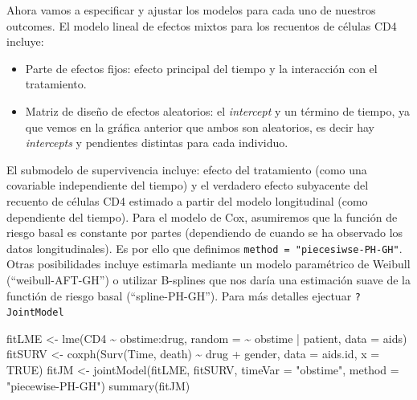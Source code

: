 \documentclass[
]{book}
\newenvironment{Shaded}{\begin{snugshade}}{\end{snugshade}}
\newcommand{\AttributeTok}[1]{\textcolor[rgb]{0.77,0.63,0.00}{#1}}
\newcommand{\ConstantTok}[1]{\textcolor[rgb]{0.00,0.00,0.00}{#1}}
\newcommand{\FunctionTok}[1]{\textcolor[rgb]{0.00,0.00,0.00}{#1}}
\newcommand{\NormalTok}[1]{#1}
\newcommand{\OtherTok}[1]{\textcolor[rgb]{0.56,0.35,0.01}{#1}}
\newcommand{\SpecialCharTok}[1]{\textcolor[rgb]{0.00,0.00,0.00}{#1}}
\newcommand{\StringTok}[1]{\textcolor[rgb]{0.31,0.60,0.02}{#1}}
\providecommand{\tightlist}{%
  \setlength{\itemsep}{0pt}\setlength{\parskip}{0pt}}
\begin{document}
Ahora vamos a especificar y ajustar los modelos para cada uno de nuestros outcomes. El modelo lineal de efectos mixtos para los recuentos de células CD4 incluye:

\begin{itemize}
\tightlist
\item
  Parte de efectos fijos: efecto principal del tiempo y la interacción con el tratamiento.
\item
  Matriz de diseño de efectos aleatorios: el \emph{intercept} y un término de tiempo, ya que vemos en la gráfica anterior que ambos son aleatorios, es decir hay \emph{intercepts} y pendientes distintas para cada individuo.
\end{itemize}

El submodelo de supervivencia incluye: efecto del tratamiento (como una covariable independiente del tiempo) y el verdadero efecto subyacente del recuento de células CD4 estimado a partir del modelo longitudinal (como dependiente del tiempo). Para el modelo de Cox, asumiremos que la función de riesgo basal es constante por partes (dependiendo de cuando se ha observado los datos longitudinales). Es por ello que definimos \texttt{method\ =\ "piecesiwse-PH-GH"}. Otras posibilidades incluye estimarla mediante un modelo paramétrico de Weibull (``weibull-AFT-GH'') o utilizar B-splines que nos daría una estimación suave de la functión de riesgo basal (``spline-PH-GH''). Para más detalles ejectuar \texttt{?JointModel}

\begin{Shaded}
\begin{Highlighting}[]
\NormalTok{fitLME }\OtherTok{\textless{}{-}} \FunctionTok{lme}\NormalTok{(CD4 }\SpecialCharTok{\textasciitilde{}}\NormalTok{ obstime}\SpecialCharTok{:}\NormalTok{drug, }\AttributeTok{random =} \SpecialCharTok{\textasciitilde{}}\NormalTok{ obstime }\SpecialCharTok{|}\NormalTok{ patient, }\AttributeTok{data =}\NormalTok{ aids)}
\NormalTok{fitSURV }\OtherTok{\textless{}{-}} \FunctionTok{coxph}\NormalTok{(}\FunctionTok{Surv}\NormalTok{(Time, death) }\SpecialCharTok{\textasciitilde{}}\NormalTok{ drug }\SpecialCharTok{+}\NormalTok{ gender, }\AttributeTok{data =}\NormalTok{ aids.id, }\AttributeTok{x =} \ConstantTok{TRUE}\NormalTok{)}
\NormalTok{fitJM }\OtherTok{\textless{}{-}} \FunctionTok{jointModel}\NormalTok{(fitLME, fitSURV, }\AttributeTok{timeVar =} \StringTok{"obstime"}\NormalTok{, }\AttributeTok{method =} \StringTok{"piecewise{-}PH{-}GH"}\NormalTok{)}
\FunctionTok{summary}\NormalTok{(fitJM)}
\end{Highlighting}
\end{Shaded}
\end{document}
